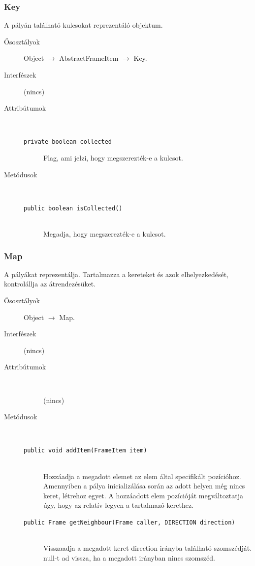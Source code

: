 		\subsubsection{Key}
				 A pályán található kulcsokat reprezentáló objektum. 			\begin{description}


				\item[Ősosztályok] Object $\rightarrow{}$ AbstractFrameItem $\rightarrow{}$ Key.
				\item[Interfészek] (nincs)
				\item[Attribútumok]$\ $
					\begin{description}
						\item[\texttt{private boolean collected}] Flag, ami jelzi, hogy megszerezték-e a kulcsot. 
					\end{description}
				\item[Metódusok]$\ $
					\begin{description}
						\item[\texttt{public boolean isCollected()}] \hfill \\ Megadja, hogy megszerezték-e a kulcsot. 
					\end{description}
			\end{description}

		\subsubsection{Map}
				 A pályákat reprezentálja. Tartalmazza a kereteket és azok elhelyezkedését,  kontrolállja az átrendezésüket. 			\begin{description}


				\item[Ősosztályok] Object $\rightarrow{}$ Map.
				\item[Interfészek] (nincs)
				\item[Attribútumok]$\ $
					\begin{description}
						\item[] (nincs)
					\end{description}
				\item[Metódusok]$\ $
					\begin{description}
						\item[\texttt{public void addItem(FrameItem item)}] \hfill \\ Hozzáadja a megadott elemet az elem által specifikált pozícióhoz.  Amennyiben a pálya inicializálása során az adott helyen még nincs keret,  létrehoz egyet.   A hozzáadott elem pozícióját megváltoztatja úgy, hogy az relatív  legyen a tartalmazó kerethez. 
						\item[\texttt{public Frame getNeighbour(Frame caller, DIRECTION direction)}] \hfill \\ Visszaadja a megadott keret direction irányba található  szomszédját. null-t ad vissza, ha a megadott irányban  nincs szomszéd. 
					\end{description}
			\end{description}

